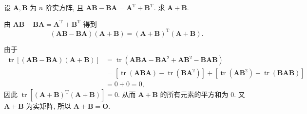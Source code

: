 \documentclass[../../main.tex]{subfiles}%
\begin{document}
\begin{example}
设 $\boldsymbol{A}, \boldsymbol{B}$ 为 $n$ 阶实方阵, 且 $\boldsymbol{AB} - \boldsymbol{BA} = \boldsymbol{A}^{\mathrm{T}} + \boldsymbol{B}^{\mathrm{T}}$. 求 $\boldsymbol{A} + \boldsymbol{B}$.
\end{example}
\begin{solution}

由 $\boldsymbol{AB} - \boldsymbol{BA} = \boldsymbol{A}^{\mathrm{T}} + \boldsymbol{B}^{\mathrm{T}}$ 得到
$$
(\boldsymbol{AB} - \boldsymbol{BA})(\boldsymbol{A} + \boldsymbol{B}) = (\boldsymbol{A} + \boldsymbol{B})^{\mathrm{T}}(\boldsymbol{A} + \boldsymbol{B}).
$$

由于
$$
\begin{aligned}
\operatorname{tr}\left[(\boldsymbol{AB} - \boldsymbol{BA})(\boldsymbol{A} + \boldsymbol{B})\right] &= \operatorname{tr}\left(\boldsymbol{ABA} - \boldsymbol{BA}^2 + \boldsymbol{AB}^2 - \boldsymbol{BAB}\right) \\
&= \left[\operatorname{tr}\left(\boldsymbol{ABA}\right) - \operatorname{tr}\left(\boldsymbol{BA}^2\right)\right] + \left[\operatorname{tr}\left(\boldsymbol{AB}^2\right) - \operatorname{tr}\left(\boldsymbol{BAB}\right)\right] \\
&= 0 + 0 = 0,
\end{aligned}
$$
因此 $\operatorname{tr}\left[(\boldsymbol{A} + \boldsymbol{B})^{\mathrm{T}}(\boldsymbol{A} + \boldsymbol{B})\right] = 0$. 从而 $\boldsymbol{A} + \boldsymbol{B}$ 的所有元素的平方和为 $0$. 又 $\boldsymbol{A} + \boldsymbol{B}$ 为实矩阵, 所以 $\boldsymbol{A} + \boldsymbol{B} = \boldsymbol{O}$.

\end{solution}
\end{document}
